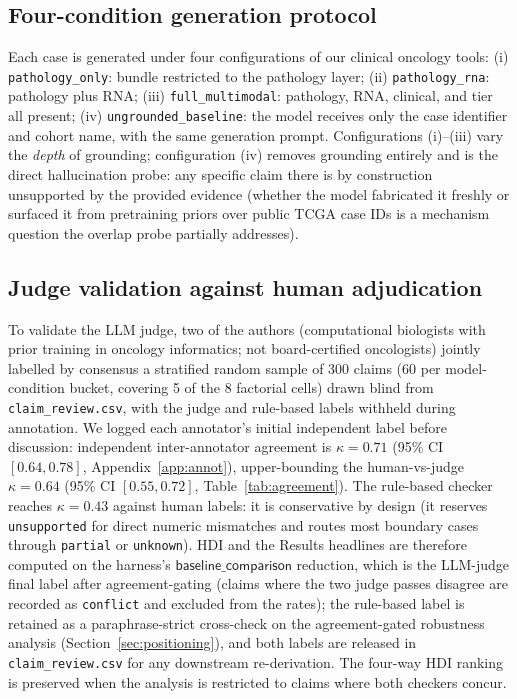 \documentclass{article}
\theoremstyle{plain}
\begin{document}
\subsection{Four-condition generation protocol}
Each case is generated under four configurations of our clinical oncology tools: (i) \texttt{pathology\_only}: bundle restricted to the pathology layer; (ii) \texttt{pathology\_rna}: pathology plus RNA; (iii) \texttt{full\_multimodal}: pathology, RNA, clinical, and tier all present; (iv) \texttt{ungrounded\_baseline}: the model receives only the case identifier and cohort name, with the same generation prompt. Configurations (i)--(iii) vary the \emph{depth} of grounding; configuration (iv) removes grounding entirely and is the direct hallucination probe: any specific claim there is by construction unsupported by the provided evidence (whether the model fabricated it freshly or surfaced it from pretraining priors over public TCGA case IDs is a mechanism question the overlap probe partially addresses).

\subsection{Judge validation against human adjudication}
\label{sec:validation}
To validate the LLM judge, two of the authors (computational biologists with prior training in oncology informatics; not board-certified oncologists) jointly labelled by consensus a stratified random sample of 300 claims (60 per model-condition bucket, covering 5 of the 8 factorial cells) drawn blind from \texttt{claim\_review.csv}, with the judge and rule-based labels withheld during annotation. We logged each annotator's initial independent label before discussion: independent inter-annotator agreement is $\kappa = 0.71$ (95\% CI $[0.64, 0.78]$, Appendix~\ref{app:annot}), upper-bounding the human-vs-judge $\kappa = 0.64$ (95\% CI $[0.55, 0.72]$, Table~\ref{tab:agreement}). The rule-based checker reaches $\kappa = 0.43$ against human labels: it is conservative by design (it reserves \texttt{unsupported} for direct numeric mismatches and routes most boundary cases through \texttt{partial} or \texttt{unknown}). HDI and the Results headlines are therefore computed on the harness's $\textsf{baseline\_comparison}$ reduction, which is the LLM-judge final label after agreement-gating (claims where the two judge passes disagree are recorded as \texttt{conflict} and excluded from the rates); the rule-based label is retained as a paraphrase-strict cross-check on the agreement-gated robustness analysis (Section~\ref{sec:positioning}), and both labels are released in \texttt{claim\_review.csv} for any downstream re-derivation. The four-way HDI ranking is preserved when the analysis is restricted to claims where both checkers concur.
\end{document}
